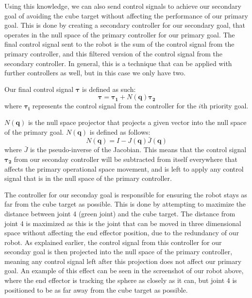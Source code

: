 \documentclass[11pt]{article}
\begin{document}
Using this knowledge, we can also send control signals to achieve our secondary goal of avoiding the cube target without affecting the performance of our primary goal. This is done by creating a secondary controller for our secondary goal, that operates in the null space of the primary controller for our primary goal. The final control signal sent to the robot is the sum of the control signal from the primary controller, and this filtered version of the control signal from the secondary controller. In general, this is a technique that can be applied with further controllers as well, but in this case we only have two.

Our final control signal \(\pmb{\tau}\) is defined as such: \[\pmb{\tau} = \pmb{\tau_1} + N(\pmb{q})\pmb{\tau_2}\] where \(\pmb{\tau_i}\) represents the control signal from the controller for the \(i\)th priority goal.

\(N(\pmb{q})\) is the null space projector that projects a given vector into the null space of the primary goal. \(N(\pmb{q})\) is defined as follows: \[N(\pmb{q}) = I - J(\pmb{q}) \bar{J}(\pmb{q})\] where \(\bar{J}\) is the pseudo-inverse of the Jacobian. This means that the control signal \(\pmb{\tau_2}\) from our seconday controller will be subtracted from itself everywhere that affects the primary operational space movement, and is left to apply any control signal that is in the null space of the primary controller.

The controller for our seconday goal is responsible for ensuring the robot stays as far from the cube target as possible. This is done by attempting to maximize the distance between joint 4 (green joint) and the cube target. The distance from joint 4 is maximized as this is the joint that can be moved in three dimensional space without affecting the end effector position, due to the redundancy of our robot. As explained earlier, the control signal from this controller for our seconday goal is then projected into the null space of the primary controller, meaning any control signal left after this projection does not affect our primary goal. An example of this effect can be seen in the screenshot of our robot above, where the end effector is tracking the sphere as closely as it can, but joint 4 is positioned to be as far away from the cube target as possible.
\end{document}
